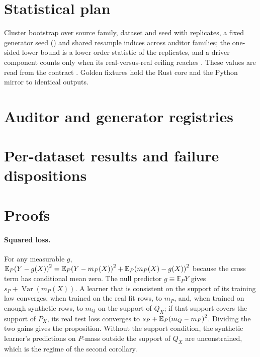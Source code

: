 \documentclass{article}
\newcommand{\E}{\mathbb{E}}
\newcommand{\Var}{\operatorname{Var}}
\newcommand{\Sq}[1]{{#1}^{\Two}}
\begin{document}
\section{Statistical plan}
\label{app:stats}
Cluster bootstrap over source family, dataset and seed with \BootstrapReplicates{} replicates, a
fixed generator seed (\BootstrapSeed) and shared resample indices across auditor families; the
one-sided \LowerBoundLevel{} lower bound is a lower order statistic of the replicates, and a
driver component counts only when its real-versus-real ceiling reaches \StabilityFloor. These values
are read from the \ContractState{} contract \ContractId. Golden fixtures hold the Rust core and the
Python mirror to identical outputs. 

\section{Auditor and generator registries}
\label{app:registries}

\medskip
{}

\section{Per-dataset results and failure dispositions}
\label{app:datasets}


\section{Proofs}
\label{app:proofs}
\paragraph{Squared loss.} For any measurable $g$,
$\E_P\Sq{(Y - g(X))} = \E_P\Sq{(Y - m_P(X))} + \E_P\Sq{(m_P(X) - g(X))}$ because the cross term has
conditional mean zero. The null predictor $g \equiv \E_P Y$ gives $s_P + \Var(m_P(X))$. A learner that is
consistent on the support of its training law converges, when trained on the real fit rows, to $m_P$, and,
when trained on enough synthetic rows, to $m_Q$ on the support of $Q_X$; if that support covers the support of
$P_X$, its real test loss converges to $s_P + \E_P\Sq{(m_Q - m_P)}$. Dividing the two gains gives the
proposition. Without the support condition, the synthetic learner's predictions on $P$-mass outside the
support of $Q_X$ are unconstrained, which is the regime of the second corollary.
\end{document}
